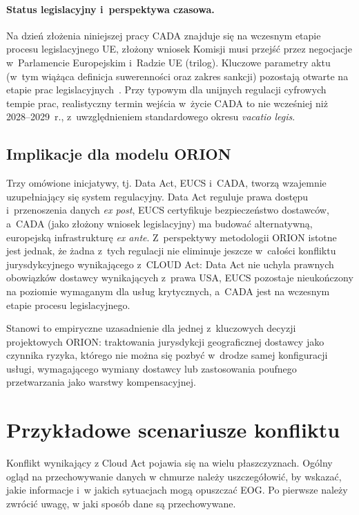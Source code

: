 \paragraph{Status legislacyjny i~perspektywa czasowa.}
Na dzień złożenia niniejszej pracy CADA znajduje się na wczesnym etapie
procesu legislacyjnego UE, złożony wniosek Komisji musi przejść
przez negocjacje w~Parlamencie Europejskim i~Radzie UE (trilog).
Kluczowe parametry aktu (w~tym wiążąca definicja suwerenności
oraz zakres sankcji) pozostają otwarte na etapie prac
legislacyjnych~\autocite{cada2026}. Przy typowym dla unijnych regulacji
cyfrowych tempie prac, realistyczny termin wejścia w~życie CADA to
nie wcześniej niż 2028--2029~r., z~uwzględnieniem standardowego
okresu \textit{vacatio legis}.

\subsection*{Implikacje dla modelu ORION}

Trzy omówione inicjatywy, tj. Data Act, EUCS i~CADA, tworzą wzajemnie
uzupełniający się system regulacyjny. Data Act reguluje prawa dostępu
i~przenoszenia danych \textit{ex post}, EUCS certyfikuje bezpieczeństwo
dostawców, a~CADA (jako złożony wniosek legislacyjny) ma budować
alternatywną, europejską infrastrukturę \textit{ex ante}. Z~perspektywy
metodologii ORION istotne jest jednak, że żadna z~tych regulacji nie
eliminuje jeszcze w~całości konfliktu jurysdykcyjnego wynikającego
z~CLOUD Act: Data Act nie uchyla prawnych obowiązków dostawcy
wynikających z~prawa USA, EUCS pozostaje nieukończony na poziomie
wymaganym dla usług krytycznych, a~CADA jest na wczesnym etapie
procesu legislacyjnego.

Stanowi to empiryczne uzasadnienie dla jednej z~kluczowych decyzji
projektowych ORION: traktowania jurysdykcji geograficznej dostawcy jako
czynnika ryzyka, którego nie można się pozbyć w~drodze samej konfiguracji
usługi, wymagającego wymiany dostawcy lub zastosowania poufnego przetwarzania
jako warstwy kompensacyjnej.



\section{Przykładowe scenariusze konfliktu}

Konflikt wynikający z Cloud Act pojawia się na wielu płaszczyznach. Ogólny ogląd na przechowywanie danych w chmurze należy uszczegółowić, by wskazać, jakie informacje i~w jakich sytuacjach mogą opuszczać EOG. Po pierwsze należy zwrócić uwagę, w jaki sposób dane są przechowywane.


